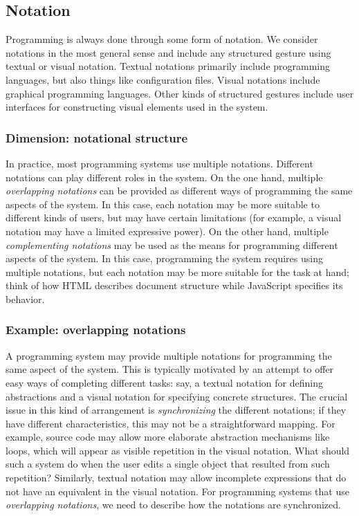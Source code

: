 \documentclass[english,submission]{programming}
\begin{document}
\hypertarget{notation}{%
\subsection{Notation}\label{notation}}


Programming is always done through some form of notation. We consider
notations in the most general sense and include any structured gesture
using textual or visual notation. Textual notations primarily include
programming languages, but also things like configuration files. Visual
notations include graphical programming languages. Other kinds of
structured gestures include user interfaces for constructing visual
elements used in the system.

\hypertarget{dimension-notational-structure}{%
\subsubsection{Dimension: notational
structure}\label{dimension-notational-structure}}

In practice, most programming systems use multiple notations. Different
notations can play different roles in the system. On the one hand,
multiple \emph{overlapping notations} can be provided as different ways
of programming the same aspects of the system. In this case, each
notation may be more suitable to different kinds of users, but may have
certain limitations (for example, a visual notation may have a limited
expressive power). On the other hand, multiple \emph{complementing
notations} may be used as the means for programming different aspects of
the system. In this case, programming the system requires using multiple
notations, but each notation may be more suitable for the task at hand;
think of how HTML describes document structure while JavaScript
specifies its behavior.

\hypertarget{example-overlapping-notations}{%
\subsubsection{Example: overlapping
notations}\label{example-overlapping-notations}}

A programming system may provide multiple notations for programming the
same aspect of the system. This is typically motivated by an attempt to
offer easy ways of completing different tasks: say, a textual notation
for defining abstractions and a visual notation for specifying concrete
structures. The crucial issue in this kind of arrangement is
\emph{synchronizing} the different notations; if they have different
characteristics, this may not be a straightforward mapping. For example,
source code may allow more elaborate abstraction mechanisms like loops,
which will appear as visible repetition in the visual notation. What
should such a system do when the user edits a single object that
resulted from such repetition? Similarly, textual notation may allow
incomplete expressions that do not have an equivalent in the visual
notation. For programming systems that use \emph{overlapping notations},
we need to describe how the notations are synchronized.
\end{document}
